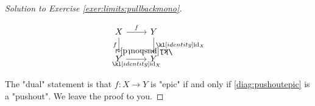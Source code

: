 \documentclass[main.tex]{subfiles}
\begin{document}
\begin{proof}[Solution to Exercise \ref{exer:limits:pullbackmono}]
    \begin{marginfigure}[1\baselineskip]
        \begin{equation}\label{diag:pushoutepic}
            \begin{tikzcd}
                X & Y \\
                Y & Y
                \arrow["{\id_X}"', from=2-1, to=2-2]
                \arrow["f"', from=1-1, to=2-1]
                \arrow["{\id_X}", from=1-2, to=2-2]
                \arrow["f", from=1-1, to=1-2]
                \arrow["\pushoutd"{anchor=center, pos=0.125, rotate=180}, draw=none, from=2-2, to=1-1]
            \end{tikzcd}
        \end{equation}
    \end{marginfigure}
    The "dual" statement is that $f: X \rightarrow Y$ is "epic" if and only if \eqref{diag:pushoutepic} is a "pushout". We leave the proof to you.
\end{proof}
\end{document}
